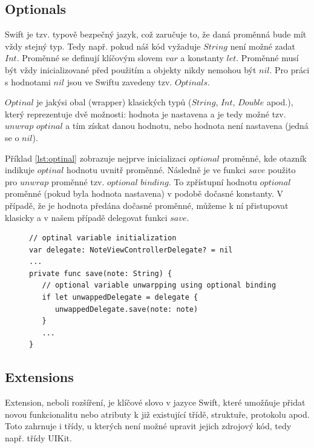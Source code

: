 \documentclass[thesis=M,czech]{FITthesis}[2012/06/26]
\begin{document}
\subsection{Optionals}
Swift je tzv. typově bezpečný jazyk, což zaručuje to, že daná proměnná bude mít vždy stejný typ. Tedy např. pokud náš kód vyžaduje $String$ není možné zadat $Int$. 
Proměnné se definují klíčovým slovem $var$ a konstanty $let$. Proměnné musí být vždy inicializované před použitím a objekty nikdy nemohou být $nil$. Pro práci s hodnotami $nil$ jsou ve Swiftu zavedeny tzv. $Optinals$.

$Optinal$ je jakýsi obal (wrapper) klasických typů ($String$, $Int$, $Double$ apod.), který reprezentuje dvě možnosti: hodnota je nastavena a je tedy možné tzv. $unwrap$ $optinal$ a tím získat danou hodnotu, nebo hodnota není nastavena (jedná se o $nil$). \cite{devBasics}

Příklad \ref{lst:optinal} zobrazuje nejprve inicializaci $optional$ proměnné, kde otazník indikuje $optinal$ hodnotu uvnitř proměnné. Následně je ve funkci $save$ použito pro $unwrap$ proměnné tzv. $optional$ $binding$. To zpřístupní hodnotu $optional$ proměnné (pokud byla hodnota nastavena) v podobě dočasné konstanty. V případě, že je hodnota předána dočasné proměnné, můžeme k ní přistupovat klasicky a v našem případě delegovat funkci $save$.

\begin{figure}
\begin{minipage}{\linewidth}
\begin{lstlisting}[caption={Příklad práce s Optinal},label={lst:optinal}]
// optinal variable initialization
var delegate: NoteViewControllerDelegate? = nil
...
private func save(note: String) {
   // optional variable unwarpping using optional binding
   if let unwappedDelegate = delegate {
      unwappedDelegate.save(note: note)
   }
   ...
}

\end{lstlisting}
\end{minipage}
\end{figure}


\subsection{Extensions}
Extension, neboli rozšíření, je klíčové slovo v jazyce Swift, které umožňuje přidat novou funkcionalitu nebo atributy k již existující třídě, struktuře, protokolu apod. Toto zahrnuje i třídy, u kterých není možné upravit jejich zdrojový kód, tedy např. třídy UIKit.
\end{document}
